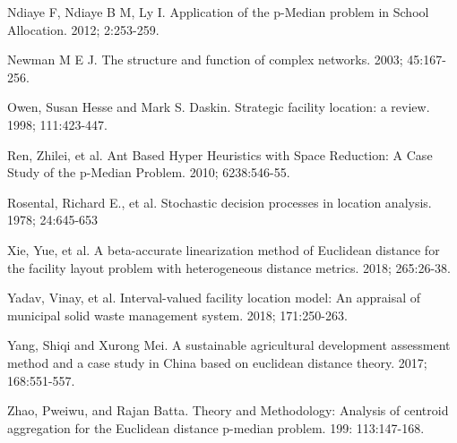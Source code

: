\documentclass[twoside,twocolumn]{article}
\begin{document}
\begin{thebibliography}{99}
Ndiaye F, Ndiaye B M, Ly I.
\newblock Application of the p-Median problem in School Allocation.
 2012; 2:253-259.

Newman M E J.
\newblock The structure and function of complex networks.
 2003; 45:167-256.

Owen, Susan Hesse and Mark S. Daskin.
\newblock Strategic facility location: a review.
 1998; 111:423-447.

Ren, Zhilei, et al.
\newblock Ant Based Hyper Heuristics with Space Reduction: A Case Study of the p-Median Problem.
 2010; 6238:546-55.

Rosental, Richard E., et al.
\newblock Stochastic decision processes in location analysis.
 1978; 24:645-653

Xie, Yue, et al.
\newblock A beta-accurate linearization method of Euclidean distance for the facility layout problem with heterogeneous distance metrics.
 2018; 265:26-38.

Yadav, Vinay, et al.
\newblock Interval-valued facility location model: An appraisal of municipal solid waste management system.
 2018; 171:250-263.

Yang, Shiqi and Xurong Mei.
\newblock A sustainable agricultural development assessment method and a case study in China based on euclidean distance theory.
 2017; 168:551-557.

Zhao, Pweiwu, and Rajan Batta.
\newblock Theory and Methodology: Analysis of centroid aggregation for the Euclidean distance p-median problem.
 199: 113:147-168.

\end{thebibliography}
\end{document}
